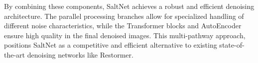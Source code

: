By combining these components, SaltNet achieves a robust and efficient denoising architecture. The parallel processing branches allow for specialized handling of different noise characteristics, while the Transformer blocks and AutoEncoder ensure high quality in the final denoised images. This multi-pathway approach, positions SaltNet as a competitive and efficient alternative to existing state-of-the-art denoising networks like Restormer.
